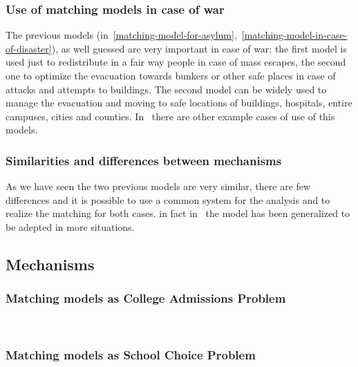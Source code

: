 \documentclass[letterpaper]{article} %
\begin{document}
    \subsubsection{Use of matching models in case of war}\label{use-of-matching-model-in-case-of-war}%
    The previous models (in~\ref{matching-model-for-asylum},~\ref{matching-model-in-case-of-disaster}), as well guessed
    are very important in case of war: the first model is used just
    to redistribute in a fair way people in case of mass escapes, the second one to optimize the evacuation
    towards bunkers or other safe places in case of attacks and attempts to buildings.
    The second model can be widely used to manage the evacuation and moving to safe locations of buildings, hospitals,
    entire campuses, cities and counties.
    In~\citet{delacretaz_2020,delacretaz_2019,delacretaz_2016}   there are other example cases of use of this models.

    \subsubsection{Similarities and differences between mechanisms}\label{similarities-and-differences-between-mechanisms}

    As we have seen the two previous models are very similar, there are few differences and it is possible to use a
    common system for the analysis and to realize the matching for both cases.
    in fact in~\citet{delacretaz_2020} the model has been generalized to be adepted in more situations.

    \subsection{Mechanisms}

    \subsubsection{Matching models as College Admissions Problem}\label{matching-model-as-college-admissions-problem}~\citet{basshuysen}


    \subsubsection{Matching models as School Choice Problem}\label{matching-model-as-school-choice-problem}~\citet{basshuysen}
\end{document}
